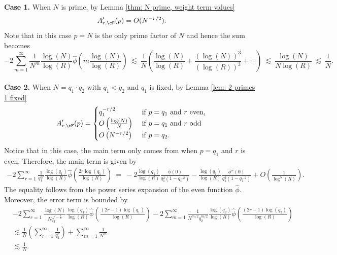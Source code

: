 \documentclass[11pt, reqno]{amsart}
\theoremstyle{definition}
\theoremstyle{remark}
\numberwithin{equation}{section}
\renewcommand{\hat}{\widehat}
\begin{document}
\noindent \textbf{Case 1. } When $N$ is prime, by Lemma \ref{thm: N prime, weight term values}
\[
A'_{r,\cF}(p)= O(N^{-r/2}).
\]
Note that in this case $p = N$ is the only prime factor of $N$ and hence the sum becomes
\begin{equation}
-2\sum_{m = 1}^\infty \frac{1}{N^m}\frac{\log(N)}{\log(R)}\hat\phi\left(m \frac{\log(N)}{\log(R)}\right)
\ \lesssim\ \frac{1}{N}\left(\frac{\log(N)}{\log(R)}+\frac{(\log(N))^3}{(\log(R))^3}+\cdots\right)
\ \lesssim\ \frac{\log(N)}{N\log(R)}\ \lesssim\ \frac{1}{N}.
\end{equation}
\\
\noindent \textbf{Case 2. }When $N = q_1 \cdot q_2$ with $q_1 < q_2$ and $q_1$ is fixed, by Lemma \ref{lem: 2 primes 1 fixed}
\[
A'_{r,\cF}(p)= \begin{cases}
    q_1^{-r/2} &\text{ if $p=q_1$ and $r$ even,} \\
    O\left(\frac{\log(N)}{N}\right) &\text{ if $p=q_1 $ and $r$ odd}\\
    O\left(N^{-r/2}\right) &\text{ if $p = q_2$}.
\end{cases}\\
\]
Notice that in this case, the main term only comes from when $p=q_1$ and $r$  is even. Therefore, the main term is given by
\small\begin{align}
    -2\sum_{r=1}^\infty \frac{1}{q_1^{2r}}\frac{\log(q_1)}{\log(R)}\hat\phi\left(\frac{2r\log(q_1)}{\log(R)}\right)\ =\ -2\frac{\log(q_1)}{\log(R)}\frac{\hat\phi(0)}{q_1^2(1-q_1^{-2})}- \frac{\log(q_1)}{\log(R)}\frac{\hat\phi''(0)}{q_1^2(1-q_1^{-2})} + O\left(\frac{1}{\log^5(R)}\right).
\end{align}\normalsize
The equality follows from the power series expansion of the even function $\hat\phi.$ Moreover, the error term is bounded by 
\begin{align}
     &-2\sum_{r=1}^\infty \frac{\log(N)}{N q_1^{r-\frac{1}{2}}}\frac{\log(q_1)}{\log(R)}\hat\phi\left(\frac{(2r-1)\log(q_1)}{\log(R)}\right) -2\sum_{m=1}^\infty \frac{1}{N^{m/2} q_2^{m/2}}\frac{\log(q_2)}{\log(R)}\hat\phi\left(\frac{(2r-1)\log(q_2)}{\log(R)}\right)\nonumber \\
    &\lesssim \frac{1}{N}\left(\sum_{r=1}^\infty \frac{1}{q_1^r}\right) + \sum_{m=1}^\infty \frac{1}{N^{m}}\nonumber \\ &\lesssim \frac{1}{N}.
\end{align}
\end{document}
